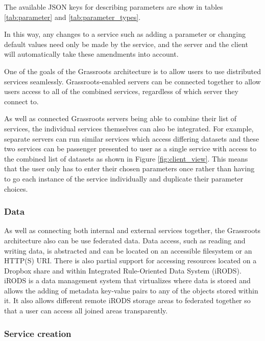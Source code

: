 \documentclass[9pt,a4paper]{extarticle}
\begin{document}
The available JSON keys for describing parameters are show in tables \ref{tab:parameter} and \ref{tab:parameter_types}.


In this way, any changes to a service such as adding a parameter or changing default values need only be made by the service, and the server and the client will automatically take these amendments into account.

One of the goals of the Grassroots architecture is to allow users to use distributed services seamlessly.
Grassroots-enabled servers can be connected together to allow users access to all of the combined services, regardless of which server they connect to. 

As well as connected Grassroots servers being able to combine their list of services, the individual services themselves can also be integrated. 
For example, separate servers can run similar services which access differing datasets and these two services can be passenger presented to user as a single service with access to the combined list of datasets as shown in Figure \ref{fig:client_view}. 
This means that the user only has to enter their chosen parameters once rather than having to go each instance of the service individually and duplicate their parameter choices. 

\subsubsection*{Data}

As well as connecting both internal and external services together, the Grassroots architecture also can be use federated data. Data access, such as reading and writing data, is abstracted and can be located on an accessible filesystem or an HTTP(S) URI. 
There is also partial support for accessing resources located on a Dropbox\cite{Dropbox} share and within Integrated Rule-Oriented Data System (iRODS)\cite{2007AGUFMIN13B1214R}. iRODS is a data management system that virtualizes where data is stored and allows the adding of metadata key-value pairs to any of the objects stored within it. It also allows different remote iRODS storage areas to federated together so that a user can access all joined areas transparently.


\subsubsection*{Service creation}
\end{document}
